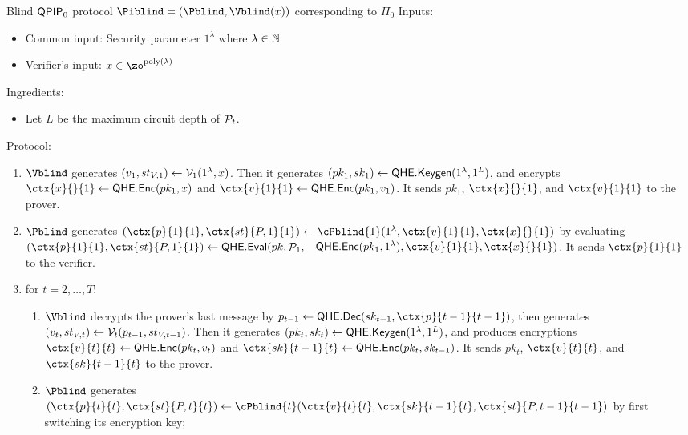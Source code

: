 \begin{protocol}{Blind $\operatorname{\mathsf{QPIP}}_0$ protocol $\Piblind=(\Pblind, \Vblind(x))$ corresponding to $\Pi_0$}
    Inputs:
    \begin{itemize}
        \item Common input: Security parameter $1^\lambda$ where $\lambda\in\mathbb{N}$
        \item Verifier's input: $x\in\zo^{\poly(\lambda)}$
    \end{itemize}

    Ingredients:
    \begin{itemize}
        \item Let $L$ be the maximum circuit depth of $\mathcal{P}_t$.
    \end{itemize}

    Protocol:
    \begin{enumerate}
        \item $\Vblind$ generates $(v_1, st_{V, 1})\leftarrow\mathcal{V}_1(1^\lambda, x)$.
            Then it generates $(pk_1, sk_1)\leftarrow\mathsf{QHE.Keygen}(1^\lambda, 1^L)$,
            and encrypts $\ctx{x}{}{1}\leftarrow\QEnc(pk_1, x)$ and $\ctx{v}{1}{1}\leftarrow\QEnc(pk_1, v_1)$.
            It sends $pk_1$, $\ctx{x}{}{1}$, and $\ctx{v}{1}{1}$ to the prover.
        \item $\Pblind$ generates $(\ctx{p}{1}{1}, \ctx{st}{P, 1}{1})\leftarrow\cPblind{1}(1^\lambda, \ctx{v}{1}{1}, \ctx{x}{}{1})$
            by evaluating
            $(\ctx{p}{1}{1}, \ctx{st}{P, 1}{1})\leftarrow  \QEval(pk, \cP_1,$ \  $\QEnc(pk_1, 1^\lambda), \ctx{v}{1}{1}, \ctx{x}{}{1})$.
            It sends $\ctx{p}{1}{1}$ to the verifier.
        \item for $t=2,\ldots,T$:
        \begin{enumerate}
            \item $\Vblind$ decrypts the prover's last message by $p_{t-1}\leftarrow\QDec(sk_{t-1}, \ctx{p}{t-1}{t-1})$,
                then generates $(v_t, st_{V, t})\leftarrow\mathcal{V}_t(p_{t-1}, st_{V, t-1})$.
                Then it generates $(pk_t, sk_t)\leftarrow\mathsf{QHE.Keygen}(1^\lambda, 1^L)$,
                and produces encryptions $\ctx{v}{t}{t}\leftarrow\QEnc(pk_t, v_t)$ and $\ctx{sk}{t-1}{t}\leftarrow\QEnc(pk_t, sk_{t-1})$.
                It sends $pk_t$, $\ctx{v}{t}{t}$, and $\ctx{sk}{t-1}{t}$ to the prover.
            \item $\Pblind$ generates $(\ctx{p}{t}{t}, \ctx{st}{P, t}{t})\leftarrow\cPblind{t}(\ctx{v}{t}{t}, \ctx{sk}{t-1}{t}, \ctx{st}{P, t-1}{t-1})$
                by first switching its encryption key;

\end{enumerate}
\end{enumerate}
\end{protocol}
